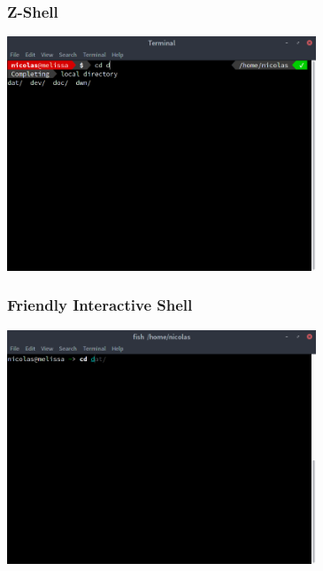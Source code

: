 \begin{frame}
    \frametitle{Z-Shell}
    \begin{center}
        \includegraphics[height=7cm]{res/zshdemo.png}
    \end{center}
\end{frame}

\begin{frame}
    \frametitle{Friendly Interactive Shell}
    \begin{center}
        \includegraphics[height=7cm]{res/fishdemo.png}
    \end{center}
\end{frame}
